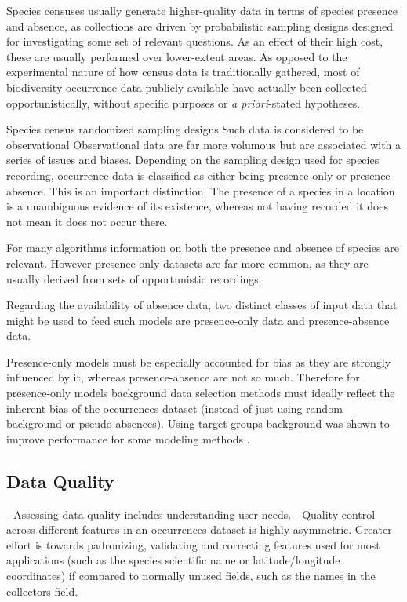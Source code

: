 \documentclass[a4paper]{article}
\begin{document}
Species censuses usually generate higher-quality data in terms of species presence and absence, as collections are driven by probabilistic sampling designs designed for investigating some set of relevant questions. As an effect of their high cost, these are usually performed over lower-extent areas. 
As opposed to the experimental nature of how census data is traditionally gathered, most of biodiversity occurrence data publicly available have actually been collected opportunistically, without specific purposes or \textit{a priori}-stated hypotheses. 

Species census randomized sampling designs Such data is considered to be observational 
Observational data are far more volumous but are associated with a series of issues and biases.
Depending on the sampling design used for species recording, occurrence data is classified as either being presence-only or presence-absence. This is an important distinction.
The presence of a species in a location is a unambiguous evidence of its existence, whereas not having recorded it does not mean it does not occur there.

For many algorithms information on both the presence and absence of species are relevant.
However presence-only datasets are far more common, as they are usually derived from sets of opportunistic recordings. 


Regarding the availability of absence data, two distinct classes of input data that might be used to feed such models are presence-only data and presence-absence data.

Presence-only models must be especially accounted for bias as they are strongly influenced by it, whereas presence-absence are not so much. Therefore for presence-only models background data selection methods must ideally reflect the inherent bias of the occurrences dataset (instead of just using random background or pseudo-absences). Using target-groups background was shown to improve performance for some modeling methods \cite{Phillips2009}.
 
\subsection{Data Quality}
 - Assessing data quality includes understanding user needs. \cite{KochVeiga2017}
 - Quality control across different features in an occurrences dataset is highly asymmetric. Greater effort is towards padronizing, validating and correcting features used for most applications (such as the species scientific name or latitude/longitude coordinates) if compared to normally unused fields, such as the names in the collectors field.
 
\end{document}

